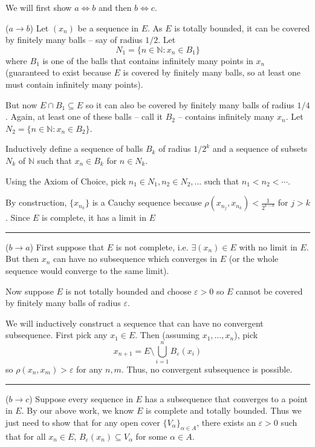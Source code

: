 \documentclass[12pt]{article}
\newcommand{\N}{\mathbb{N}}
\newcommand{\ep}{\varepsilon}
\newcommand{\sub}{\subseteq}
\renewcommand{\div}{\vspace*{10pt}\hrule \vspace*{10pt}}
\begin{document}
    \color{blue}
        We will first show $a \iff b$ and then $b \iff c$. 

        ($a \to b$) Let $(x_n)$ be a sequence in $E$. As $E$ is totally bounded, it can be covered by finitely many balls -- say of radius $1/2$. Let 
        \[N_1 = \{n \in \N: x_n \in B_1\}\]
        where $B_1$ is one of the balls that contains infinitely many points in $x_n$ (guaranteed to exist because $E$ is covered by finitely many balls, so at least one must contain infinitely many points). 

        But now $E \cap B_1 \sub E$ so it can also be covered by finitely many balls of radius $1/4$. Again, at least one of these balls -- call it $B_2$ -- contains infinitely many $x_n$. Let $N_2 = \{n \in \N: x_n \in B_2\}$. 

        Inductively define a sequence of balls $B_k$ of radius $1/2^k$ and a sequence of subsets $N_k$ of $\N$ such that $x_n \in B_k$ for $n \in N_k$. 

        Using the Axiom of Choice, pick $n_1 \in N_1, n_2 \in N_2, \dots$ such that $n_1 < n_2 < \cdots$. 

        By construction, $\{x_{n_k}\}$ is a Cauchy sequence because $\rho(x_{n_j}, x_{n_k}) < \frac{1}{2^{1 - k}}$ for $j > k$. Since $E$ is complete, it has a limit in $E$

        \div 

        ($b \to a$) First suppose that $E$ is not complete, i.e. $\exists (x_n) \in E$ with no limit in $E$. But then $x_n$ can have no subsequence which converges in $E$ (or the whole sequence would converge to the same limit). 

        Now suppose $E$ is not totally bounded and choose $\ep > 0$ so $E$ cannot be covered by finitely many balls of radius $\ep$. 

        We will inductively construct a sequence that can have no convergent subsequence. First pick any $x_1 \in E$. Then (assuming $x_1, \dots, x_n$), pick 
        \[x_{n+1} = E \setminus \bigcup_{i=1}^n B_{\ep}(x_i)\]
        so $\rho(x_n, x_m) > \ep$ for any $n, m$. Thus, no convergent subsequence is possible. 

        \div

        ($b \to c$) Suppose every sequence in $E$ has a subsequence that converges to a point in $E$. By our above work, we know $E$ is complete and totally bounded. Thus we just need to show that for any open cover $\{V_{\alpha}\}_{\alpha \in A}$, there exists an $\ep > 0$ such that for all $x_n \in E$, $B_{\ep}(x_n) \sub V_{\alpha}$ for some $\alpha \in A$. 
        
\end{document}
